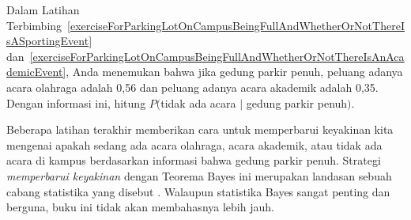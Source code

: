 \begin{exercisewrap}
\begin{nexercise} \label{exerciseForParkingLotOnCampusBeingFullAndWhetherOrNotThereIsNoEvent}
Dalam Latihan Terbimbing~\ref{exerciseForParkingLotOnCampusBeingFullAndWhetherOrNotThereIsASportingEvent} dan~\ref{exerciseForParkingLotOnCampusBeingFullAndWhetherOrNotThereIsAnAcademicEvent}, Anda menemukan bahwa jika gedung parkir penuh, peluang adanya acara olahraga adalah 0,56 dan peluang adanya acara akademik adalah 0,35. Dengan informasi ini, hitung $P($tidak ada acara $|$ gedung parkir penuh$)$.\footnotemark
\end{nexercise}
\end{exercisewrap}

Beberapa latihan terakhir memberikan cara untuk memperbarui keyakinan kita mengenai apakah sedang ada acara olahraga, acara akademik, atau tidak ada acara di kampus berdasarkan informasi bahwa gedung parkir penuh. Strategi \emph{memperbarui keyakinan} dengan Teorema Bayes ini merupakan landasan sebuah cabang statistika yang disebut . Walaupun statistika Bayes sangat penting dan berguna, buku ini tidak akan membahasnya lebih jauh.



{}
